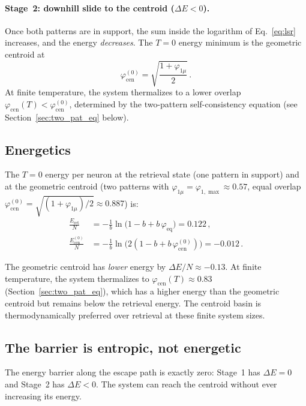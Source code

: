 \documentclass[11pt]{article}
\begin{document}
\paragraph{Stage~2: downhill slide to the centroid ($\Delta E < 0$).}
Once both patterns are in support, the sum inside the logarithm of Eq.~\eqref{eq:lsr} increases, and the energy \emph{decreases}.  The $T = 0$ energy minimum is the geometric centroid at
\begin{equation}
\varphi_{\mathrm{cen}}^{(0)} = \sqrt{\frac{1+\varphi_{1\mu}}{2}}\,.
\label{eq:phi_cen}
\end{equation}
At finite temperature, the system thermalizes to a lower overlap $\varphi_{\mathrm{cen}}(T) < \varphi_{\mathrm{cen}}^{(0)}$, determined by the two-pattern self-consistency equation (see Section~\ref{sec:two_pat_eq} below).

\subsection{Energetics}

The $T = 0$ energy per neuron at the retrieval state (one pattern in support) and at the geometric centroid (two patterns with $\varphi_{1\mu} = \varphi_{1,\max} \approx 0.57$, equal overlap $\varphi_{\mathrm{cen}}^{(0)} = \sqrt{(1+\varphi_{1\mu})/2} \approx 0.887$) is:
\begin{align}
\frac{E_{\mathrm{ret}}}{N} &= -\frac{1}{b}\ln\!\big(1 - b + b\,\varphi_{\mathrm{eq}}\big) = 0.122\,, \\
\frac{E_{\mathrm{cen}}^{(0)}}{N} &= -\frac{1}{b}\ln\!\big(2(1 - b + b\,\varphi_{\mathrm{cen}}^{(0)})\big) = -0.012\,.
\end{align}

The geometric centroid has \emph{lower} energy by $\Delta E/N \approx -0.13$.  At finite temperature, the system thermalizes to $\varphi_{\mathrm{cen}}(T) \approx 0.83$ (Section~\ref{sec:two_pat_eq}), which has a higher energy than the geometric centroid but remains below the retrieval energy.  The centroid basin is thermodynamically preferred over retrieval at these finite system sizes.

\subsection{The barrier is entropic, not energetic}

The energy barrier along the escape path is exactly zero: Stage~1 has $\Delta E = 0$ and Stage~2 has $\Delta E < 0$.  The system can reach the centroid without ever increasing its energy.
\end{document}
